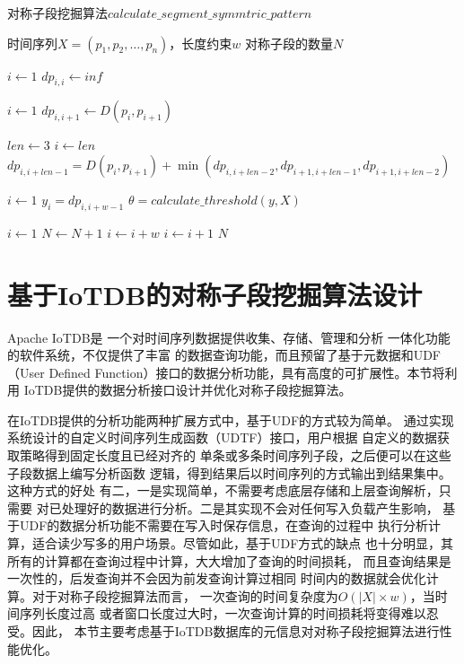 \begin{algorithm}[t]
  \caption{对称子段挖掘算法$calculate\_segment\_symmtric\_pattern$}
  \label{alg:symmetric_pattern}
  \small
  \begin{algorithmic}
    \REQUIRE 时间序列$X=\left(p_{1}, p_{2}, \dots, p_{n}\right)$，长度约束$w$
    \ENSURE 对称子段的数量$N$

    \STATE $i \leftarrow 1$
    \STATE $dp_{i,i} \leftarrow inf$
    \ENDWHILE

    \STATE $i \leftarrow 1$
    \STATE $dp_{i,i+1} \leftarrow D\left(p_{i}, p_{i+1}\right)$
    \ENDWHILE

    \STATE $len \leftarrow 3$
    \STATE $i \leftarrow len$
    \STATE $dp_{i,i+len-1} = D\left(p_{i}, p_{i+1}\right)+\min \left(dp_{i,i+len-2},dp_{i+1,i+len-1},dp_{i+1,i+len-2}\right)$
    \ENDWHILE
    \ENDWHILE

    \STATE $i \leftarrow 1$
    \STATE $y_i=dp_{i,i+w-1}$
    \ENDWHILE
    \STATE $\theta = calculate\_threshold\left(y,X\right)$

    \STATE $i \leftarrow 1$
    \STATE $N \leftarrow N + 1$
    \STATE $i \leftarrow i+w$
    \ELSE
    \STATE $i \leftarrow i+1$
    \ENDIF
    \ENDWHILE
    \RETURN $N$
  \end{algorithmic}
\end{algorithm}

\section{基于IoTDB的对称子段挖掘算法设计}

Apache IoTDB是
一个对时间序列数据提供收集、存储、管理和分析
一体化功能的软件系统，不仅提供了丰富
的数据查询功能，而且预留了基于元数据和UDF（User Defined 
Function）接口的数据分析功能，具有高度的可扩展性。本节将利用
IoTDB提供的数据分析接口设计并优化对称子段挖掘算法。

在IoTDB提供的分析功能两种扩展方式中，基于UDF的方式较为简单。
通过实现系统设计的自定义时间序列生成函数（UDTF）接口，用户根据
自定义的数据获取策略得到固定长度且已经对齐的
单条或多条时间序列子段，之后便可以在这些子段数据上编写分析函数
逻辑，得到结果后以时间序列的方式输出到结果集中。这种方式的好处
有二，一是实现简单，不需要考虑底层存储和上层查询解析，只需要
对已处理好的数据进行分析。二是其实现不会对任何写入负载产生影响，
基于UDF的数据分析功能不需要在写入时保存信息，在查询的过程中
执行分析计算，适合读少写多的用户场景。尽管如此，基于UDF方式的缺点
也十分明显，其所有的计算都在查询过程中计算，大大增加了查询的时间损耗，
而且查询结果是一次性的，后发查询并不会因为前发查询计算过相同
时间内的数据就会优化计算。对于对称子段挖掘算法而言，
一次查询的时间复杂度为$O(|X| \times w)$，当时间序列长度过高
或者窗口长度过大时，一次查询计算的时间损耗将变得难以忍受。因此，
本节主要考虑基于IoTDB数据库的元信息对对称子段挖掘算法进行性能优化。

